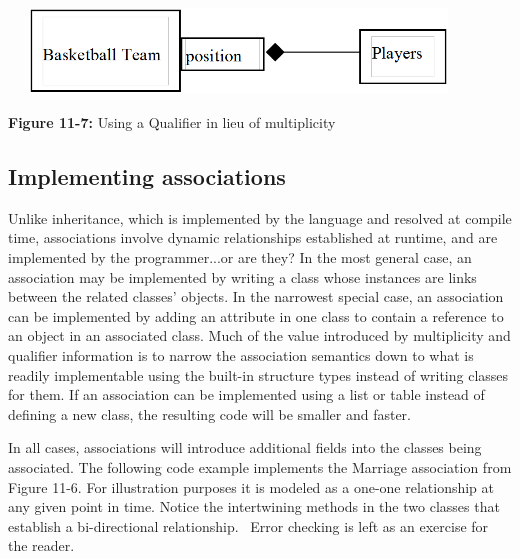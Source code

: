 \bigskip

\includegraphics[width=4.8in,height=0.9in]{ub-img/qualifier.png}

{\sffamily\bfseries Figure 11-7:}
{\sffamily Using a Qualifier in lieu of multiplicity}

\subsection*{Implementing associations}

Unlike inheritance, which is implemented by the language and resolved at
compile time, associations involve dynamic
relationships established at runtime, and are implemented by the
programmer...or are they? In the most general case, an association may
be implemented by writing a class whose instances are links between the
related classes' objects. In the narrowest special
case, an association can be implemented by adding an attribute in one
class to contain a reference to an object in an
associated class. Much of the value introduced by multiplicity and
qualifier information is to narrow the association semantics down to
what is readily implementable using the built-in structure types
instead of writing classes for them. If an association can be
implemented using a list or table instead of defining a new class, the
resulting code will be smaller and faster.

In all cases, associations will introduce additional fields into the
classes being associated. The following code example implements the
Marriage association from Figure 11-6. For illustration purposes it is
modeled as a one-one relationship at any given point in time. Notice
the intertwining methods in the two classes that establish a
bi-directional relationship. \ Error checking is left as an exercise
for the reader.


